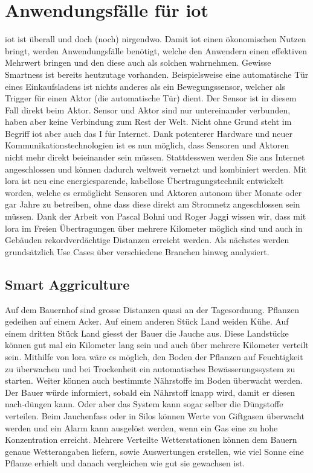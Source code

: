 \chapter{Anwendungsfälle für \gls{iot}}\label{Anwendungsfälle für IoT}

\gls{iot} ist überall und doch (noch) nirgendwo. Damit \gls{iot} einen ökonomischen Nutzen bringt, werden Anwendungsfälle benötigt, welche den Anwendern einen effektiven Mehrwert bringen und den diese auch als solchen wahrnehmen. Gewisse \glqq{}Smartness\grqq{} ist bereits heutzutage vorhanden. Beispielsweise eine automatische Tür eines Einkaufsladens ist nichts anderes als ein Bewegungssensor, welcher als Trigger für einen Aktor (die automatische Tür) dient. Der Sensor ist in diesem Fall direkt beim Aktor. Sensor und Aktor sind nur untereinander verbunden, haben aber keine Verbindung zum \glqq{}Rest der Welt\grqq{}.
Nicht ohne Grund steht im Begriff \gls{iot} aber auch das \glqq{}I\grqq{} für Internet. Dank potenterer Hardware und neuer Kommunikationstechnologien ist es nun möglich, dass Sensoren und Aktoren nicht mehr direkt beieinander sein müssen. Stattdesswen werden Sie ans Internet angeschlossen und können dadurch weltweit vernetzt und kombiniert werden. Mit \gls{lora} ist neu eine energiesparende, kabellose Übertragungstechnik entwickelt worden, welche es ermöglicht Sensoren und Aktoren autonom über Monate oder gar Jahre zu betreiben, ohne dass diese direkt am Stromnetz angeschlossen sein müssen. Dank der Arbeit von Pascal Bohni und Roger Jaggi \autocite[29]{bfh:optimizedDataTransmission} wissen wir, dass mit \gls{lora} im Freien Übertragungen über mehrere Kilometer möglich sind und auch in Gebäuden rekordverdächtige Distanzen erreicht werden. Als nächstes werden grundsätzlich Use Cases über verschiedene Branchen hinweg analysiert.


\section{Smart Aggriculture}
Auf dem Bauernhof sind grosse Distanzen quasi an der Tagesordnung. Pflanzen gedeihen auf einem Acker. Auf einem anderen Stück Land weiden Kühe. Auf einem dritten Stück Land giesst der Bauer die Jauche aus. Diese Landstücke können gut mal ein Kilometer lang sein und auch über mehrere Kilometer verteilt sein. Mithilfe von \gls{lora} wäre es möglich, den Boden der Pflanzen auf Feuchtigkeit zu überwachen und bei Trockenheit ein automatisches Bewässerungssystem zu starten. Weiter können auch bestimmte Nährstoffe im Boden überwacht werden. Der Bauer würde informiert, sobald ein Nährstoff knapp wird, damit er diesen nach-düngen kann. Oder aber das System kann sogar selber die Düngstoffe verteilen. Beim Jauchenfass oder in Silos können Werte von Giftgasen überwacht werden und ein Alarm kann ausgelöst werden, wenn ein Gas eine zu hohe Konzentration erreicht. Mehrere Verteilte Wetterstationen können dem Bauern genaue Wetterangaben liefern, sowie Auswertungen erstellen, wie viel Sonne eine Pflanze erhielt und danach vergleichen wie gut sie gewachsen ist.

